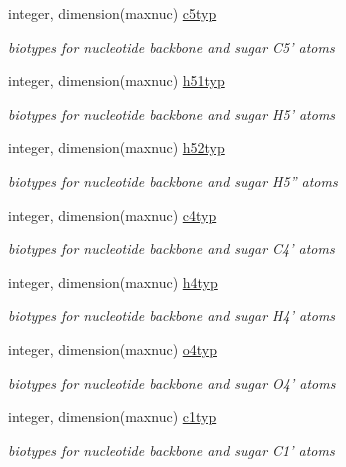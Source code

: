\begin{DoxyCompactItemize}
integer, dimension(maxnuc) \hyperlink{classresdue_a6643ae3326878cc4594ab3133a514951}{c5typ}
\begin{DoxyCompactList}\small\item\em biotypes for nucleotide backbone and sugar C5' atoms \end{DoxyCompactList}\item 
integer, dimension(maxnuc) \hyperlink{classresdue_a9736062e8c8c235ef06de2f4b279d327}{h51typ}
\begin{DoxyCompactList}\small\item\em biotypes for nucleotide backbone and sugar H5' atoms \end{DoxyCompactList}\item 
integer, dimension(maxnuc) \hyperlink{classresdue_a8d8b285ff85ed1830b08e4b3288334b5}{h52typ}
\begin{DoxyCompactList}\small\item\em biotypes for nucleotide backbone and sugar H5'' atoms \end{DoxyCompactList}\item 
integer, dimension(maxnuc) \hyperlink{classresdue_ac55d40734d1d1447f6563a917f496afc}{c4typ}
\begin{DoxyCompactList}\small\item\em biotypes for nucleotide backbone and sugar C4' atoms \end{DoxyCompactList}\item 
integer, dimension(maxnuc) \hyperlink{classresdue_aaeadfe458580a8c49cd4f5e145281242}{h4typ}
\begin{DoxyCompactList}\small\item\em biotypes for nucleotide backbone and sugar H4' atoms \end{DoxyCompactList}\item 
integer, dimension(maxnuc) \hyperlink{classresdue_a88a1df13143a4d2b4e252e4f25d3f1dc}{o4typ}
\begin{DoxyCompactList}\small\item\em biotypes for nucleotide backbone and sugar O4' atoms \end{DoxyCompactList}\item 
integer, dimension(maxnuc) \hyperlink{classresdue_a3c4a2a9aa6358a0182a34342206ee5ac}{c1typ}
\begin{DoxyCompactList}\small\item\em biotypes for nucleotide backbone and sugar C1' atoms \end{DoxyCompactList}\item 

\end{DoxyCompactItemize}
